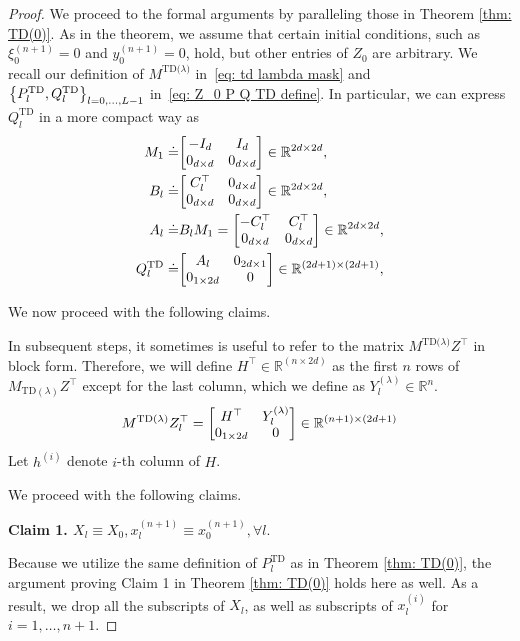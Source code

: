 \documentclass{article}
\newcommand{\R}{\mathbb{R}}
\newcommand{\paren}[1]{{\left(#1\right)}}
\newcommand{\td}{\text{TD}}
\newcommand{\tdlambda}{\text{TD($\lambda$)}}
\begin{document}
\begin{proof}
    We proceed to the formal arguments by paralleling those in Theorem \ref{thm: TD(0)}. As in the theorem, we assume that certain initial conditions, such as $\xi_0^{(n+1)} = 0$ and $y_0^{(n+1)} = 0$, hold, but other entries of $Z_0$ are arbitrary.
    We recall our definition of $M^\tdlambda$ in~\eqref{eq: td lambda mask} and $\qty{P_l^{\td}, Q_l^{\td}}_{l=0,\dots,L-1}$ in~\eqref{eq: Z_0 P Q TD define}.
    In particular,
    we can express $Q_l^{\td}$ in a more compact way as
    \begin{align}
      M_1 \doteq& \mqty[-I_{d} & I_{d} \\0_{d \times d} & 0_{d \times d}] \in \R^{2d \times 2d}, \label{eq: lambda M_1 define}\\
      B_l \doteq& \mqty[C_l^\top & 0_{d\times d} \\ 0_{d \times d} & 0_{d \times d}] \in \R^{2d \times 2d},\\
      A_l \doteq& B_l M_1  = \mqty[-C_l^\top & C_l^\top \\ 0_{d \times d} & 0_{d \times d}] \in \R^{2d \times 2d},\\
      Q_l^{\td} \doteq& \mqty[A_l & 0_{2d \times 1} \\ 0_{1 \times 2d} & 0] \in \R^{(2d + 1) \times (2d+1)},
    \end{align}

We now proceed with the following claims. 

    In subsequent steps, it sometimes is useful to refer to the matrix $M^\tdlambda Z^{\top}$ in block form. Therefore, we will define $H^\top \in \R^{\paren{n \times 2d}}$ as the first $n$ rows of $M_{\td(\lambda)}Z^\top$ except for the last column, which we define as $Y_l^{(\lambda)} \in \R^n$.
    \begin{align}
        M^\tdlambda Z_l^{\top} = \mqty[H^\top & Y_l^{(\lambda)} \\ 0_{1\times 2d} & 0] \in \R^{(n+1) \times (2d+1)} \label{eq: M lambda ZT}
    \end{align}
    Let $h^{(i)}$ denote $i$-th column of $H$. 

We proceed with the following claims.

\textbf{Claim 1. $X_l \equiv X_0 , x_l^{(n+1)} \equiv x_0^{(n+1)}, \forall l.$}

    Because we utilize the same definition of $P_l^{\td}$ as in Theorem \ref{thm: TD(0)}, the argument proving Claim 1 in Theorem \ref{thm: TD(0)} holds here as well. As a result,
    we drop all the subscripts of $X_l$,
    as well as subscripts of $x_l^{(i)}$ for $i=1,\dots, n+1$. 
    

\end{proof}
\end{document}
